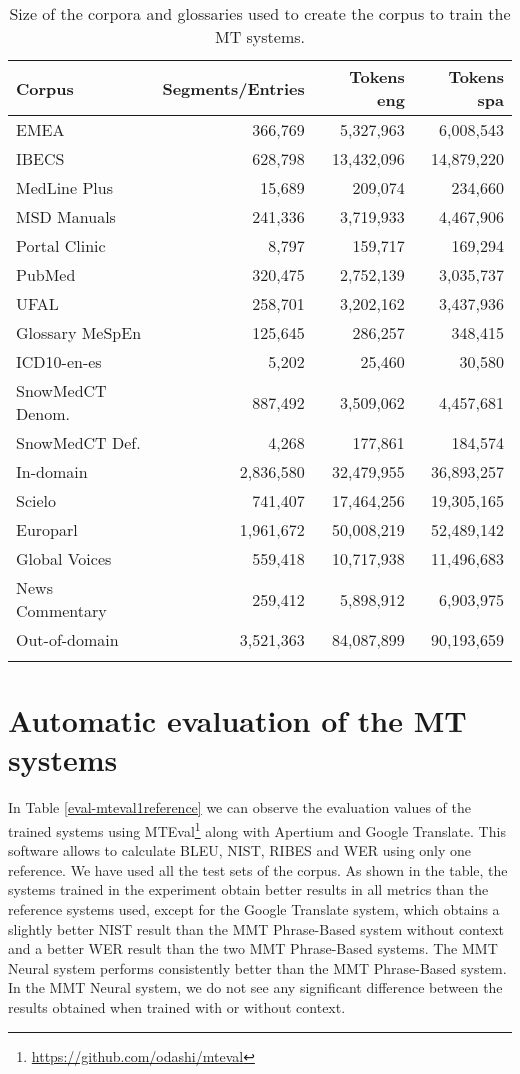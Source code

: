\documentclass[output=paper]{langsci/langscibook}
\begin{document}
\begin{table}
\begin{tabular}{lrrr}
\lsptoprule
{Corpus} & {Segments/Entries} & {Tokens eng} & {Tokens spa}\\
\midrule
EMEA & 366,769 & 5,327,963 & 6,008,543\\
IBECS & 628,798 & 13,432,096 & 14,879,220\\
MedLine Plus & 15,689 & 209,074 & 234,660\\
MSD Manuals & 241,336 & 3,719,933 & 4,467,906\\
Portal Clinic & 8,797 & 159,717 & 169,294\\
PubMed & 320,475 & 2,752,139 & 3,035,737\\
UFAL & 258,701 & 3,202,162 & 3,437,936\\
\midrule
Glossary MeSpEn & 125,645 & 286,257 & 348,415\\
ICD10-en-es & 5,202 & 25,460 & 30,580\\
SnowMedCT Denom. & 887,492 & 3,509,062 & 4,457,681\\
SnowMedCT Def. & 4,268 & 177,861 & 184,574\\
\midrule
{In-domain} & {2,836,580} & {32,479,955} & {36,893,257}\\
\midrule
Scielo & 741,407 & 17,464,256 & 19,305,165\\
Europarl & 1,961,672 & 50,008,219 & 52,489,142\\
Global Voices & 559,418 & 10,717,938 & 11,496,683\\
News Commentary & 259,412 & 5,898,912 & 6,903,975\\
\midrule
{Out-of-domain} & {3,521,363} & {84,087,899} & {90,193,659}\\
\lspbottomrule
\end{tabular}
\caption{\label{size-corpora} Size of the corpora and glossaries used to create the corpus to train the MT systems.}
\end{table}

\section{Automatic evaluation of the MT systems} \label{AutomaticevaluationoftheMTsystems}

In Table \ref{eval-mteval1reference} we can observe the evaluation values of the trained systems using MTEval\footnote{\url{https://github.com/odashi/mteval}} along with Apertium and Google Translate. This software allows to calculate BLEU, NIST, RIBES and WER using only one reference. We have used all the test sets of the corpus. As shown in the table, the systems trained in the experiment obtain better results in all metrics than the reference systems used, except for the Google Translate system, which obtains a slightly better NIST result than the MMT Phrase-Based system without context and a better WER result than the two MMT Phrase-Based systems. The MMT Neural system performs consistently better than the MMT Phrase-Based system.  In the MMT Neural system, we do not see any significant difference between the results obtained when trained with or without context.   
\end{document}
